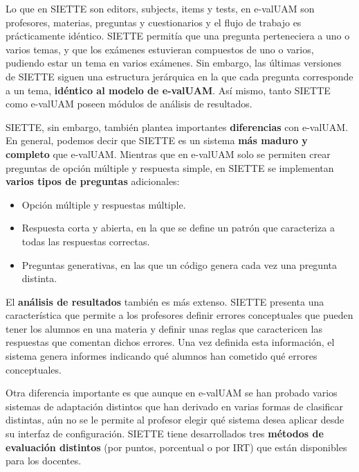 Lo que en SIETTE son editors, subjects, items y tests, en e-valUAM son profesores, materias, preguntas y cuestionarios y el flujo de trabajo es prácticamente idéntico. SIETTE permitía que una pregunta perteneciera a uno o varios temas, y que los exámenes estuvieran compuestos de uno o varios, pudiendo estar un tema en varios exámenes\cite{Conejo04}. Sin embargo, las últimas versiones de SIETTE siguen una estructura jerárquica en la que cada pregunta corresponde a un tema, \textbf{idéntico al modelo de e-valUAM}. Así mismo, tanto SIETTE como e-valUAM poseen módulos de análisis de resultados. 

SIETTE, sin embargo, también plantea importantes \textbf{diferencias} con e-valUAM. En general, podemos decir que SIETTE es un sistema \textbf{más maduro y completo} que e-valUAM. Mientras que en e-valUAM solo se permiten crear preguntas de opción múltiple y respuesta simple, en SIETTE se implementan \textbf{varios tipos de preguntas} adicionales:

\begin{itemize}
	\item Opción múltiple y respuestas múltiple.
	\item Respuesta corta y abierta, en la que se define un patrón que caracteriza a todas las respuestas correctas.
	\item Preguntas generativas, en las que un código genera cada vez una pregunta distinta.
\end{itemize}

El \textbf{análisis de resultados} también es más extenso. SIETTE presenta una característica que permite a los profesores definir errores conceptuales que pueden tener los alumnos en una materia y definir unas reglas que caractericen las respuestas que comentan dichos errores. Una vez definida esta información, el sistema genera informes indicando qué alumnos han cometido qué errores conceptuales.

Otra diferencia importante es que aunque en e-valUAM se han probado varios sistemas de adaptación distintos que han derivado en varias formas de clasificar distintas, aún no se le permite al profesor elegir qué sistema desea aplicar desde su interfaz de configuración. SIETTE tiene desarrollados tres \textbf{métodos de evaluación distintos} (por puntos, porcentual o por \acrshort{IRT}) que están disponibles para los docentes.

